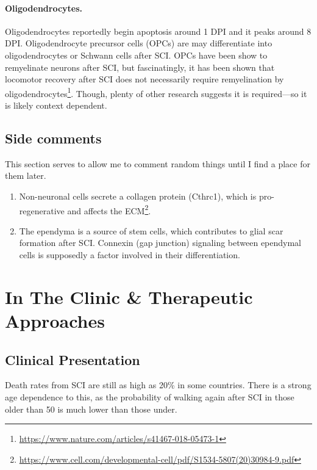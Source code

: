 \documentclass[12pt]{report}
\begin{document}
\subsubsection{Oligodendrocytes.}
Oligodendrocytes reportedly begin apoptosis around 1 DPI and it peaks around 8 DPI. Oligodendrocyte precursor cells (OPCs) are may differentiate into oligodendrocytes or Schwann cells after SCI. OPCs have been show to remyelinate neurons after SCI, but fascinatingly, it has been shown that locomotor recovery after SCI does not necessarily require remyelination by oligodendrocytes\footnote{\url{https://www.nature.com/articles/s41467-018-05473-1}}. Though, plenty of other research suggests it is required---so it is likely context dependent. 

 

\section{Side comments} 
This section serves to allow me to comment random things until I find a place for them later.

\begin{enumerate}
    \item Non-neuronal cells secrete a collagen protein (Cthrc1), which is pro-regenerative and affects the ECM\footnote{\url{https://www.cell.com/developmental-cell/pdf/S1534-5807(20)30984-9.pdf}}. 
    \item The ependyma is a source of stem cells, which contributes to glial scar formation after SCI. Connexin (gap junction) signaling between ependymal cells is supposedly a factor involved in their differentiation. 
\end{enumerate}

\chapter{In The Clinic \& Therapeutic Approaches}

\section{Clinical Presentation}
Death rates from SCI are still as high as 20\% in some countries. There is a strong age dependence to this, as the probability of walking again after SCI in those older than 50 is much lower than those under.
\end{document}
